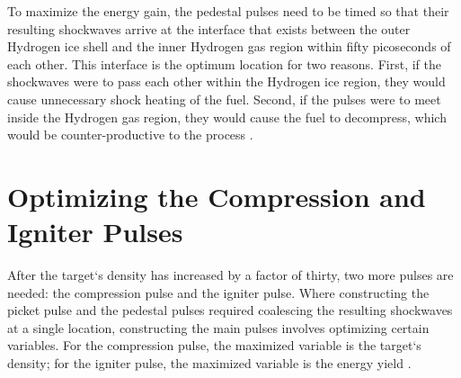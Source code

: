 To maximize the energy gain, the pedestal pulses need to be timed so that their resulting shockwaves arrive at the interface that exists between the outer Hydrogen ice shell and the inner Hydrogen gas region within fifty picoseconds of each other.  This interface is the optimum location for two reasons.  First, if the shockwaves were to pass each other within the Hydrogen ice region, they would cause unnecessary shock heating of the fuel.  Second, if the pulses were to meet inside the Hydrogen gas region, they would cause the fuel to decompress, which would be counter-productive to the process \citep{resultsVsSims}.

\section{Optimizing the Compression and Igniter Pulses}
\label{sec:mainPulses}
After the target`s density has increased by a factor of thirty, two more pulses are needed: the compression pulse and the igniter pulse.  Where constructing the picket pulse and the pedestal pulses required coalescing the resulting shockwaves at a single location, constructing the main pulses involves optimizing certain variables.  For the compression pulse, the maximized variable is the target`s density; for the igniter pulse, the maximized variable is the energy yield \citep{terryThesis}.
